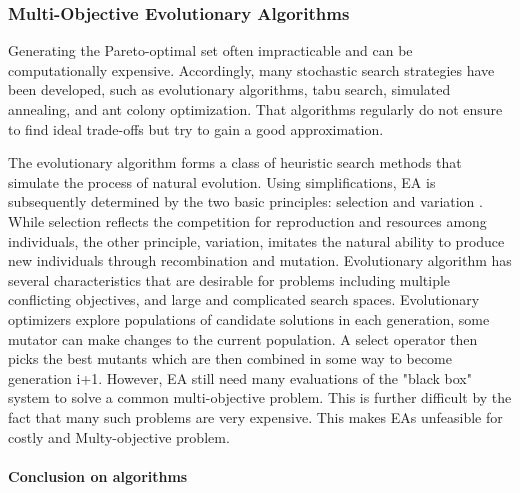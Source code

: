 
            \subsubsection{Multi-Objective Evolutionary Algorithms}
                Generating the Pareto-optimal set often impracticable and can be computationally expensive. Accordingly, many stochastic search strategies have been developed, such as evolutionary algorithms, tabu search, simulated annealing, and ant colony optimization. That algorithms regularly do not ensure to find ideal trade-offs but try to gain a good approximation.
 
                The evolutionary algorithm forms a class of heuristic search methods that simulate the process of natural evolution. Using simplifications,  EA is subsequently determined by the two basic principles: selection and variation \cite{TutMOEABrockhoff}. While selection reflects the competition for reproduction and resources among individuals, the other principle, variation, imitates the natural ability to produce new individuals through recombination and mutation. Evolutionary algorithm has several characteristics that are desirable for problems including multiple conflicting objectives, and large and complicated search spaces. Evolutionary optimizers explore populations of candidate solutions in each generation, some mutator can make changes to the current population. A select operator then picks the best mutants which are then combined in some way to become generation i+1. However, EA still need many evaluations of the "black box" system to solve a common multi-objective problem. This is further difficult by the fact that many such problems are very expensive. This makes EAs unfeasible for costly and Multy-objective problem. 


        \paragraph{Conclusion on algorithms}

